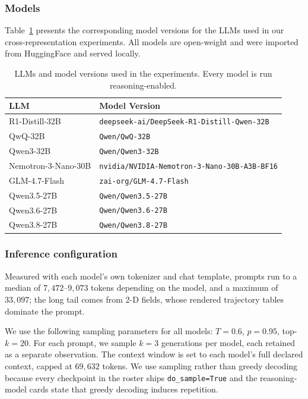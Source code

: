 \subsubsection{Models}
\label{app:xr_models}


Table~\ref{tab:xr_models} presents the corresponding model versions for the LLMs
used in our cross-representation experiments. All models are open-weight and were
imported from HuggingFace and served locally.

\begin{table}[h]
\centering
\small
\begin{tabular}{@{}ll@{}}
\toprule
LLM & Model Version  \\
\midrule
R1-Distill-32B      & \texttt{deepseek-ai/DeepSeek-R1-Distill-Qwen-32B}    \\
QwQ-32B             & \texttt{Qwen/QwQ-32B}                                \\
Qwen3-32B           & \texttt{Qwen/Qwen3-32B}                               \\
Nemotron-3-Nano-30B & \texttt{nvidia/NVIDIA-Nemotron-3-Nano-30B-A3B-BF16}  \\
GLM-4.7-Flash       & \texttt{zai-org/GLM-4.7-Flash}                        \\
Qwen3.5-27B         & \texttt{Qwen/Qwen3.5-27B}                            \\
Qwen3.6-27B         & \texttt{Qwen/Qwen3.6-27B}                             \\
Qwen3.8-27B         & \texttt{Qwen/Qwen3.8-27B}                             \\
\bottomrule
\end{tabular}
\caption{LLMs and model versions used in the experiments. Every model is run reasoning-enabled.}
\label{tab:xr_models}
\end{table}

\subsubsection{Inference configuration}
\label{app:xr_inference}

Measured with each model's own tokenizer and chat template, prompts run to a median
of $7{,}472$--$9{,}073$ tokens depending on the model, and a maximum of $33{,}097$;
the long tail comes from 2-D fields, whose rendered trajectory tables dominate the
prompt.

We use the following sampling parameters for all models: $T = 0.6$, $p = 0.95$,
top-$k = 20$. For each prompt, we sample $k = 3$ generations per model, each retained
as a separate observation. The context window is set to each model's full declared
context, capped at $69{,}632$ tokens. We use sampling rather than greedy decoding
because every checkpoint in the roster ships \texttt{do\_sample=True} and the
reasoning-model cards state that greedy decoding induces repetition.


